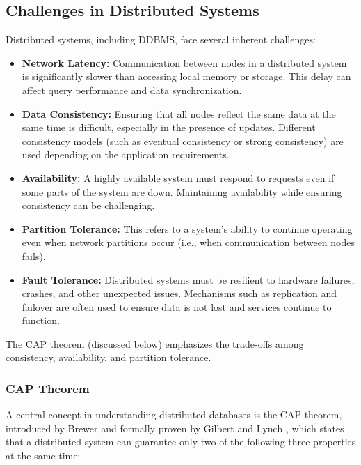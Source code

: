 \subsection{Challenges in Distributed Systems}
Distributed systems, including DDBMS, face several inherent challenges:
\begin{itemize}
	\item \textbf{Network Latency:} Communication between nodes in a distributed system is significantly slower than accessing local memory or storage.
	      This delay can affect query performance and data synchronization.

	\item \textbf{Data Consistency:} Ensuring that all nodes reflect the same data at the same time is difficult, especially in the presence of updates.
	      Different consistency models (such as eventual consistency or strong consistency) are used depending on the application requirements.

	\item \textbf{Availability:} A highly available system must respond to requests even if some parts of the system are down.
	      Maintaining availability while ensuring consistency can be challenging.

	\item \textbf{Partition Tolerance:} This refers to a system's ability to continue operating even when network partitions occur (i.e., when communication between nodes fails).

	\item \textbf{Fault Tolerance:} Distributed systems must be resilient to hardware failures, crashes, and other unexpected issues.
	      Mechanisms such as replication and failover are often used to ensure data is not lost and services continue to function.
\end{itemize}

The CAP theorem (discussed below) emphasizes the trade-offs among consistency, availability, and partition tolerance.

\subsubsection{CAP Theorem}
A central concept in understanding distributed databases is the CAP theorem, introduced by Brewer \parencite{brewerRobustDistributedSystems2000} and formally proven by Gilbert and Lynch \parencite{gilbertBrewersConjectureFeasibility2002}, which states that a distributed system can guarantee only two of the following three properties at the same time:


